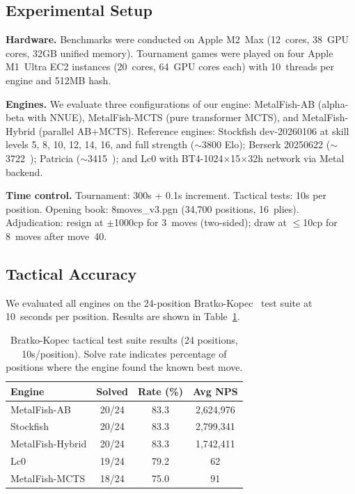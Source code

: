 \documentclass{svproc}
\begin{document}
\subsection{Experimental Setup}
\label{sec:eval-setup}

\textbf{Hardware.} Benchmarks were conducted on Apple M2~Max (12~cores, 38~GPU cores, 32GB unified memory). Tournament games were played on four Apple M1~Ultra EC2 instances (20~cores, 64~GPU cores each) with 10~threads per engine and 512MB hash.

\textbf{Engines.} We evaluate three configurations of our engine: MetalFish-AB (alpha-beta with NNUE), MetalFish-MCTS (pure transformer MCTS), and MetalFish-Hybrid (parallel AB+MCTS). Reference engines: Stockfish dev-20260106 at skill levels 5, 8, 10, 12, 14, 16, and full strength ($\sim$3800 Elo); Berserk 20250622 ($\sim$3722~\cite{ccrl}); Patricia ($\sim$3415~\cite{ccrl}); and Lc0 with BT4-1024$\times$15$\times$32h network via Metal backend.

\textbf{Time control.} Tournament: 300s + 0.1s increment. Tactical tests: 10s per position. Opening book: 8moves\_v3.pgn (34,700 positions, 16~plies). Adjudication: resign at $\pm$1000cp for 3~moves (two-sided); draw at $\leq$10cp for 8~moves after move~40.

\subsection{Tactical Accuracy}
\label{sec:eval-tactical}

We evaluated all engines on the 24-position Bratko-Kopec~\cite{bratko1982advice} test suite at 10~seconds per position. Results are shown in Table~\ref{tab:tactical}.

\begin{table}[!htbp]
\centering
\caption{Bratko-Kopec tactical test suite results (24 positions, 10s/position). Solve rate indicates percentage of positions where the engine found the known best move.}
\label{tab:tactical}
\begin{tabular}{lccc}
\toprule
\textbf{Engine} & \textbf{Solved} & \textbf{Rate (\%)} & \textbf{Avg NPS} \\
\midrule
MetalFish-AB   & 20/24 & 83.3 & 2,624,976 \\
Stockfish      & 20/24 & 83.3 & 2,799,341 \\
MetalFish-Hybrid & 20/24 & 83.3 & 1,742,411 \\
Lc0            & 19/24 & 79.2 & 62 \\
MetalFish-MCTS & 18/24 & 75.0 & 91 \\
\bottomrule
\end{tabular}
\end{table}
\end{document}
